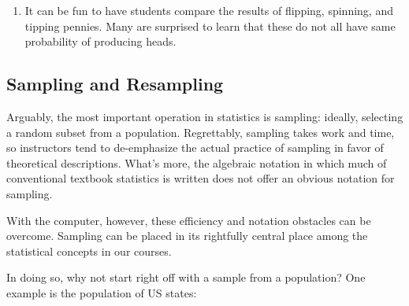 \begin{enumerate}
\item 
It can be fun to have students compare the results of flipping, spinning, and tipping pennies.
Many are surprised to learn that these do not all have same probability of producing heads.
\end{enumerate}

%

\subsection{Sampling and Resampling}

Arguably, the most important operation in statistics is sampling:
ideally, selecting a random subset from a population.  Regrettably,
sampling takes work and time, so instructors tend to de-emphasize the
actual practice of sampling in favor of theoretical descriptions.
What's more, the algebraic notation in which much of conventional
textbook statistics is written does not offer an obvious notation for sampling.

With the computer, however, these efficiency and notation obstacles
can be overcome.  Sampling can be placed in its rightfully central
place among the statistical concepts in our courses.

In doing so, why not start right off with a sample from a population?
One example is the population of US states:

%
%

